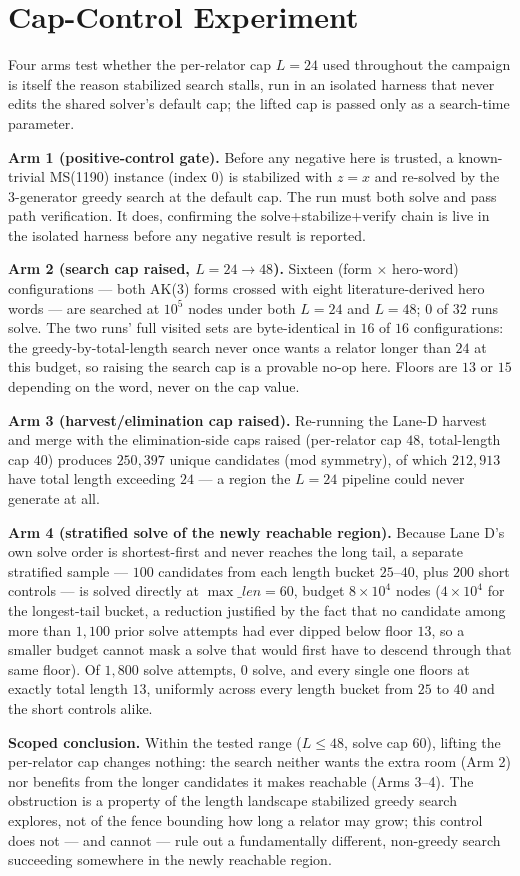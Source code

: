 \section{Cap-Control Experiment}\label{app:cap}

Four arms test whether the per-relator cap $L=24$ used throughout the campaign is itself
the reason stabilized search stalls, run in an isolated harness that never edits the shared
solver's default cap; the lifted cap is passed only as a search-time parameter.

\textbf{Arm 1 (positive-control gate).} Before any negative here is trusted, a known-trivial
MS(1190) instance (index $0$) is stabilized with $z=x$ and re-solved by the 3-generator
greedy search at the default cap. The run must both solve and pass path verification. It
does, confirming the solve+stabilize+verify chain is live in the isolated harness before any
negative result is reported.

\textbf{Arm 2 (search cap raised, $L=24\to48$).} Sixteen (form $\times$ hero-word)
configurations --- both AK(3) forms crossed with eight literature-derived hero words --- are
searched at $10^5$ nodes under both $L=24$ and $L=48$; $0$ of $32$ runs solve. The two runs'
full visited sets are byte-identical in $16$ of $16$ configurations: the
greedy-by-total-length search never once wants a relator longer than $24$ at this budget, so
raising the search cap is a provable no-op here. Floors are $13$ or $15$ depending on the
word, never on the cap value.

\textbf{Arm 3 (harvest/elimination cap raised).} Re-running the Lane-D harvest and merge
with the elimination-side caps raised (per-relator cap $48$, total-length cap $40$) produces
$250{,}397$ unique candidates (mod symmetry), of which $212{,}913$ have total length
exceeding $24$ --- a region the $L=24$ pipeline could never generate at all.

\textbf{Arm 4 (stratified solve of the newly reachable region).} Because Lane D's own solve
order is shortest-first and never reaches the long tail, a separate stratified sample ---
$100$ candidates from each length bucket $25$--$40$, plus $200$ short controls --- is solved
directly at $\max\_len=60$, budget $8\times10^4$ nodes ($4\times10^4$ for the longest-tail
bucket, a reduction justified by the fact that no candidate among more than $1{,}100$ prior
solve attempts had ever dipped below floor $13$, so a smaller budget cannot mask a solve
that would first have to descend through that same floor). Of $1{,}800$ solve attempts, $0$
solve, and every single one floors at exactly total length $13$, uniformly across every
length bucket from $25$ to $40$ and the short controls alike.

\textbf{Scoped conclusion.} Within the tested range ($L\le48$, solve cap $60$), lifting the
per-relator cap changes nothing: the search neither wants the extra room (Arm 2) nor
benefits from the longer candidates it makes reachable (Arms 3--4). The obstruction is a
property of the length landscape stabilized greedy search explores, not of the fence
bounding how long a relator may grow; this control does not --- and cannot --- rule out a
fundamentally different, non-greedy search succeeding somewhere in the newly reachable
region.
